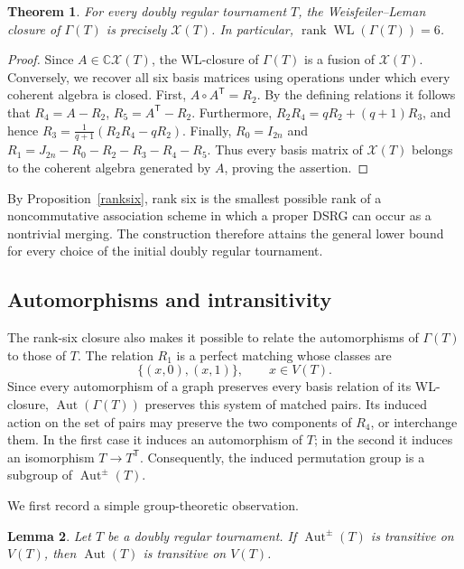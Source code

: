 \documentclass[11pt]{article}
\newtheorem{theorem}{Theorem}[section]
\newtheorem{lemma}[theorem]{Lemma}
\theoremstyle{definition}
\theoremstyle{remark}
\DeclareMathOperator{\Aut}{Aut}
\begin{document}
\begin{theorem}
\label{thm:wl}
For every doubly regular tournament $T$, the Weisfeiler--Leman closure of
$\Gamma(T)$ is precisely $\mathcal X(T)$.  In particular,
$ \operatorname{rank}\operatorname{WL}(\Gamma(T))=6$.
\end{theorem}

\begin{proof}
Since $A\in\mathbb C\mathcal X(T)$, the WL-closure of $\Gamma(T)$ is a fusion
of $\mathcal X(T)$.  Conversely, we recover all six basis matrices using
operations under which every coherent algebra is closed.  First,
$A\circ A^{\mathsf T}=R_2$.
By the defining relations it follows that
$R_4=A-R_2$, $R_5=A^{\mathsf T}-R_2$.
Furthermore, 
$R_2R_4=qR_2+(q+1)R_3$,
and hence
$ R_3=\frac{1}{q+1}(R_2R_4-qR_2)$.
Finally, $R_0=I_{2n}$ and
$R_1=J_{2n}-R_0-R_2-R_3-R_4-R_5$.
Thus every basis matrix of $\mathcal X(T)$ belongs to the coherent algebra
generated by $A$, proving the assertion.
\end{proof}

By Proposition~\ref{ranksix}, rank six is the smallest possible
rank of a noncommutative association scheme in which a proper DSRG can occur
as a nontrivial merging.  The construction therefore attains the general
lower bound for every choice of the initial doubly regular tournament.

\subsection{Automorphisms and intransitivity}

The rank-six closure also makes it possible to relate the automorphisms of
$\Gamma(T)$ to those of $T$.  The relation $R_1$ is a perfect matching whose
classes are
\begin{equation}
 \{(x,0),(x,1)\},\qquad x\in V(T).
 \label{pairs}
\end{equation}
Since every automorphism of a graph preserves every basis relation of its
WL-closure, $\Aut(\Gamma(T))$ preserves this system of matched pairs.  Its
induced action on the set of pairs may preserve the two components of $R_4$,
or interchange them.  In the first case it induces an automorphism of $T$;
in the second it induces an isomorphism $T\to T^{\mathsf T}$.  Consequently,
the induced permutation group is a subgroup of $\Aut^{\pm}(T)$.

We first record a simple group-theoretic observation.

\begin{lemma}
\label{ext}
Let $T$ be a doubly regular tournament.  If $\Aut^{\pm}(T)$ is transitive on $V(T)$, then
$\Aut(T)$ is transitive on $V(T)$.
\end{lemma}
\end{document}
